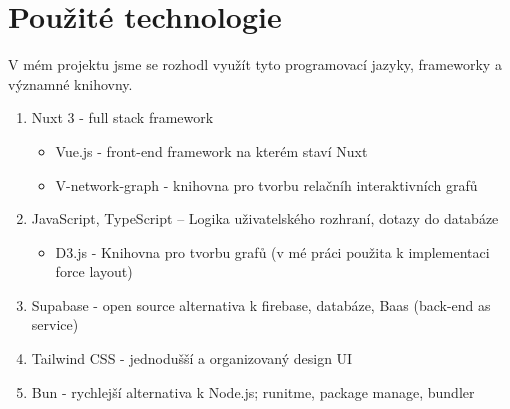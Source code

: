 \section{Použité technologie}
V mém projektu jsme se rozhodl využít tyto programovací jazyky, frameworky a významné knihovny.
\begin{enumerate}
    \item Nuxt 3 - full stack framework\cite{Nuxt}
    \begin{itemize}
        \item Vue.js - front-end framework na kterém staví Nuxt\cite{Vue}
        \item V-network-graph - knihovna pro tvorbu relačníh interaktivních grafů\cite{VNetwork}
        \end{itemize}
    \item JavaScript, TypeScript – Logika uživatelského rozhraní, dotazy do databáze
        \begin{itemize}
        \item D3.js - Knihovna pro tvorbu grafů (v mé práci použita k implementaci force layout) \cite{D3}
        \end{itemize}
    \item Supabase - open source alternativa k firebase, databáze, Baas (back-end as service)\cite{Supabase}
    \item Tailwind CSS - jednodušší a organizovaný design UI\cite{TailwindNuxt}
    \item Bun - rychlejší alternativa k Node.js; runitme, package manage, bundler \cite{bun}
        
\end{enumerate}
